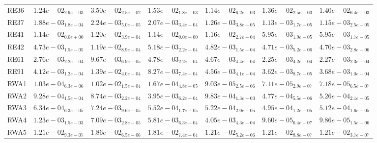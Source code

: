 \documentclass{article}
\begin{document}
\begin{table}
\begin{scriptsize}
\begin{tabular}{lllllll}
RE36 & \cellcolor{gray25}$  1.24e-02_{ 2.9e-03}$ & $  3.50e-02_{ 2.5e-02}$ & $  1.53e-02_{ 1.8e-03}$ & \cellcolor{gray95}$  1.14e-02_{ 6.2e-03}$ & $  1.36e-02_{ 2.5e-03}$ & $  1.40e-02_{ 6.4e-03}$ \\
RE37 & $  1.88e-03_{ 1.8e-04}$ & $  2.24e-03_{ 5.0e-05}$ & $  2.07e-03_{ 3.4e-04}$ & $  1.26e-03_{ 3.8e-05}$ & \cellcolor{gray95}$  1.13e-03_{ 1.7e-05}$ & \cellcolor{gray25}$  1.15e-03_{ 2.5e-05}$ \\
RE41 & $  1.14e-02_{ 0.0e+00}$ & $  1.20e-02_{ 3.9e-04}$ & $  1.14e-02_{ 0.0e+00}$ & $  1.16e-02_{ 2.7e-04}$ & \cellcolor{gray25}$  5.95e-03_{ 1.9e-05}$ & \cellcolor{gray95}$  5.95e-03_{ 1.7e-05}$ \\
RE42 & $  4.73e-03_{ 1.5e-05}$ & $  1.19e-02_{ 8.9e-04}$ & $  5.18e-03_{ 2.2e-04}$ & $  4.82e-03_{ 1.5e-04}$ & \cellcolor{gray25}$  4.71e-03_{ 5.2e-06}$ & \cellcolor{gray95}$  4.70e-03_{ 2.8e-06}$ \\
RE61 & $  2.76e-03_{ 2.2e-04}$ & $  9.67e-03_{ 6.9e-05}$ & $  4.78e-03_{ 2.2e-04}$ & $  4.67e-03_{ 4.4e-04}$ & \cellcolor{gray95}$  2.25e-03_{ 4.2e-04}$ & \cellcolor{gray25}$  2.27e-03_{ 2.3e-04}$ \\
RE91 & $  4.12e-03_{ 1.2e-04}$ & $  1.39e-02_{ 4.0e-04}$ & $  8.27e-03_{ 7.4e-04}$ & $  4.56e-03_{ 4.1e-04}$ & \cellcolor{gray95}$  3.62e-03_{ 8.7e-05}$ & \cellcolor{gray25}$  3.68e-03_{ 1.0e-04}$ \\
RWA1 & $  1.03e-04_{ 6.3e-06}$ & $  1.02e-02_{ 1.5e-04}$ & $  1.67e-04_{ 4.8e-05}$ & $  9.03e-05_{ 2.5e-06}$ & \cellcolor{gray95}$  7.11e-05_{ 2.9e-07}$ & \cellcolor{gray25}$  7.18e-05_{ 6.5e-07}$ \\
RWA2 & $  9.28e-04_{ 1.5e-04}$ & $  8.74e-03_{ 2.2e-04}$ & $  3.95e-03_{ 6.2e-04}$ & $  9.83e-04_{ 1.3e-03}$ & \cellcolor{gray95}$  4.77e-04_{ 5.5e-06}$ & \cellcolor{gray25}$  5.26e-04_{ 2.1e-05}$ \\
RWA3 & $  6.34e-04_{ 6.3e-05}$ & $  7.24e-03_{ 9.6e-05}$ & $  5.52e-04_{ 1.7e-05}$ & $  5.22e-04_{ 2.0e-05}$ & \cellcolor{gray95}$  4.95e-04_{ 1.2e-05}$ & \cellcolor{gray25}$  5.12e-04_{ 1.6e-05}$ \\
RWA4 & $  1.23e-03_{ 1.5e-03}$ & $  7.09e-03_{ 2.8e-05}$ & $  5.81e-03_{ 6.3e-04}$ & $  4.05e-03_{ 4.3e-04}$ & \cellcolor{gray95}$  9.60e-05_{ 6.4e-07}$ & \cellcolor{gray25}$  9.86e-05_{ 1.5e-06}$ \\
RWA5 & \cellcolor{gray25}$  1.21e-02_{ 9.3e-07}$ & $  1.86e-02_{ 6.5e-06}$ & $  1.81e-02_{ 7.4e-04}$ & $  1.21e-02_{ 5.2e-06}$ & $  1.21e-02_{ 8.8e-07}$ & \cellcolor{gray95}$  1.21e-02_{ 3.7e-07}$ \\

\end{tabular}
\end{scriptsize}
\end{table}
\end{document}
